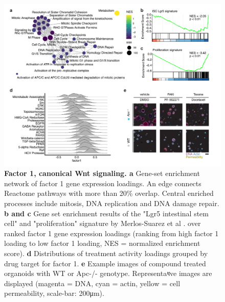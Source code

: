 \begin{flushleft}

\begin{figure}[h!]
\centering
\includegraphics[width=\textwidth,
                height=\textheight,
                keepaspectratio]{figures/adenomaprofiling/pdf/fig_2_1.pdf}
\caption{\textbf{Factor 1, canonical Wnt signaling. a} Gene-set enrichment network of factor 1 gene expression loadings. An edge connects Reactome pathways with more than 20\% overlap. Central enriched processes include mitosis, DNA replication and DNA damage repair. \textbf{b and c} Gene set enrichment results of the "Lgr5 intestinal stem cell" and "proliferation" signature by Merlos-Suarez et al \cite{Merlos-Suarez2011-gd}. over ranked factor 1 gene expression loadings (ranking from high factor 1 loading to low factor 1 loading, NES = normalized enrichment score). \textbf{d} Distributions of treatment activity loadings grouped by drug target for factor 1. \textbf{e} Example images of compound treated organoids with WT or Apc-/- genotype. Representaধve images are displayed (magenta = DNA, cyan = actin, yellow = cell permeability, scale-bar: 200μm).}
\label{fig_190}
\end{figure}
\bigbreak



\end{flushleft}
